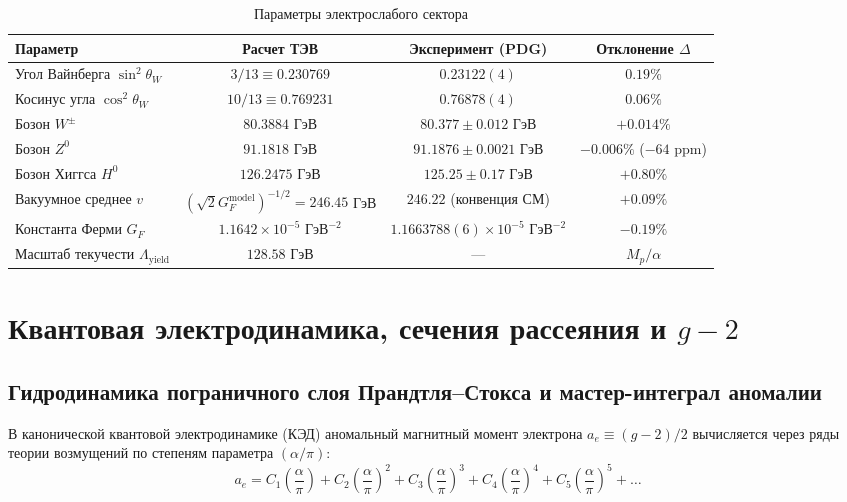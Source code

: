 \documentclass[11pt,a4paper]{article}
\theoremstyle{definition}
\theoremstyle{remark}
\begin{document}
\begin{table}[H]
\centering
\small
\caption{Параметры электрослабого сектора}
\label{tab:electroweak}
\vspace{2mm}
\begin{tabular}{lccc}
\toprule
\textbf{Параметр} & \textbf{Расчет ТЭВ} & \textbf{Эксперимент (PDG)} & \textbf{Отклонение $\Delta$} \\
\midrule
Угол Вайнберга $\sin^2\theta_W$ & $3/13 \equiv 0.230769$ & $0.23122(4)$ & $0.19\%$ \\
Косинус угла $\cos^2\theta_W$ & $10/13 \equiv 0.769231$ & $0.76878(4)$ & $0.06\%$ \\
Бозон $W^\pm$ & $80.3884$ ГэВ & $80.377 \pm 0.012$ ГэВ & $+0.014\%$ \\
Бозон $Z^0$ & $91.1818$ ГэВ & $91.1876 \pm 0.0021$ ГэВ & $-0.006\%$ ($-64\text{ ppm}$) \\
Бозон Хиггса $H^0$ & $126.2475$ ГэВ & $125.25 \pm 0.17$ ГэВ & $+0.80\%$ \\
Вакуумное среднее $v$ & $(\sqrt{2}G_F^{\mathrm{model}})^{-1/2} = 246.45$ ГэВ & $246.22$ (конвенция СМ) & $+0.09\%$ \\
Константа Ферми $G_F$ & $1.1642 \times 10^{-5}\text{ ГэВ}^{-2}$ & $1.1663788(6) \times 10^{-5}\text{ ГэВ}^{-2}$ & $-0.19\%$ \\
Масштаб текучести $\Lambda_{\mathrm{yield}}$ & $128.58$ ГэВ & --- & $M_p / \alpha$ \\
\bottomrule
\end{tabular}
\end{table}


\section{Квантовая электродинамика, сечения рассеяния и $g-2$}
\label{sec:qed_scattering}

\subsection{Гидродинамика пограничного слоя Прандтля--Стокса и мастер-интеграл аномалии}
В канонической квантовой электродинамике (КЭД) аномальный магнитный момент электрона $a_e \equiv (g-2)/2$ вычисляется через ряды теории возмущений по степеням параметра $(\alpha/\pi)$:
\begin{equation}
    a_e = C_1 \left(\frac{\alpha}{\pi}\right) + C_2 \left(\frac{\alpha}{\pi}\right)^2 + C_3 \left(\frac{\alpha}{\pi}\right)^3 + C_4 \left(\frac{\alpha}{\pi}\right)^4 + C_5 \left(\frac{\alpha}{\pi}\right)^5 + \dots
    \label{eq:qed_series}
\end{equation}
\end{document}
